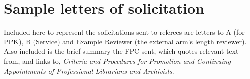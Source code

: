 \documentclass[12pt,oneside]{book}
\begin{document}
\newpage

\fancyfoot[C]{\leftmark} %


\chapter{Sample letters of solicitation}

Included here to represent the solicitations sent to referees are letters to A (for PPK), B (Service) and Example Reviewer (the external arm's length reviewer).  Also included is the brief summary the FPC sent, which quotes relevant text from, and links to, \textit{Criteria and Procedures for Promotion and Continuing Appointments of Professional Librarians and Archivists}.


\end{document}
